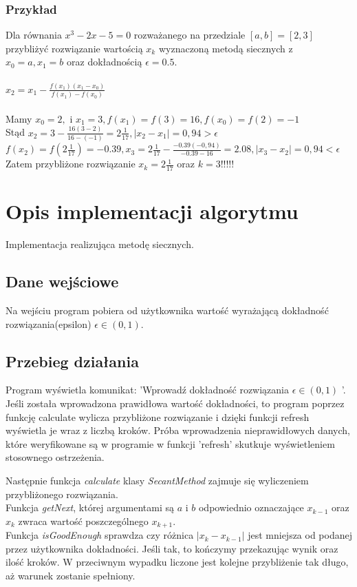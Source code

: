 \documentclass[12pt]{article}
\begin{document}
\subsubsection{Przykład}
Dla równania $x^3-2x-5=0$ rozważanego na przedziale $[a,b]=[2,3]$ przybliżyć rozwiązanie wartością $x_k$ wyznaczoną metodą siecznych z\\
$x_0=a, x_1=b$ oraz dokładnością $\epsilon = 0.5.$
\\ \\
$ x_2=x_1 - \frac{f(x_1)(x_1-x_{0})}{f(x_1)-f(x_{0})}$
\\ \\
 Mamy $ x_{0}=2,$ i $x_{1}=3, f(x_1)=f(3)=16, f(x_0)=f(2)=-1$ 
\\Stąd $x_2=3-\frac{16(3-2)}{16-(-1)}=2 \frac{1}{17}, |x_2 - x_1|=0,94 > \epsilon$
$f(x_2)=f(2 \frac{1}{17})=-0.39,x_3=2 \frac{1}{17}-\frac{-0.39(-0,94)}{-0.39-16}=2.08, |x_3 - x_2|=0,94 < \epsilon$
\\Zatem przybliżone rozwiązanie $x_k=2 \frac{1}{17}$ oraz $k=3$!!!!!
\section{Opis implementacji algorytmu}
Implementacja realizująca metodę siecznych.
\subsection{Dane wejściowe}
Na wejściu program pobiera od użytkownika wartość wyrażającą dokładność rozwiązania(epsilon) $\epsilon \in(0,1).$ 



\subsection{Przebieg działania}
Program wyświetla komunikat: 'Wprowadź dokładność rozwiązania $\epsilon \in(0,1)$ '. Jeśli została wprowadzona prawidłowa wartość dokładności, to program poprzez funkcję calculate wylicza przybliżone rozwiązanie i dzięki funkcji refresh wyświetla je wraz z liczbą kroków.
Próba wprowadzenia nieprawidłowych danych, które weryfikowane są w programie w funkcji 'refresh' skutkuje wyświetleniem stosownego ostrzeżenia.
\par Następnie funkcja \emph{calculate} klasy \emph{SecantMethod} zajmuje się wyliczeniem przybliżonego rozwiązania.\\
Funkcja \emph{getNext}, której argumentami są $a$ i $b$ odpowiednio oznaczające $x_{k-1}$ oraz $x_{k}$ zwraca wartość poszczególnego $x_{k+1}$.
\\
Funkcja \emph{isGoodEnough} sprawdza czy różnica  $|x_k - x_{k-1}|$ jest mniejsza od podanej przez użytkownika dokładności. Jeśli tak, to kończymy przekazując wynik oraz ilość kroków. W przeciwnym wypadku liczone jest kolejne przybliżenie tak długo, aż warunek zostanie spełniony.
\end{document}
